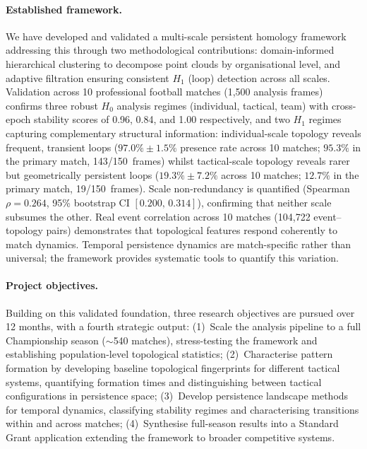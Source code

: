 \paragraph{Established framework.}
We have developed and validated a multi-scale persistent homology framework \citep{Brown2026} addressing this through two methodological contributions: domain-informed hierarchical clustering to decompose point clouds by organisational level, and adaptive filtration ensuring consistent $H_1$ (loop) detection across all scales. Validation across 10 professional football matches (1{,}500 analysis frames) confirms three robust $H_0$ analysis regimes (individual, tactical, team) with cross-epoch stability scores of 0.96, 0.84, and 1.00 respectively, and two $H_1$ regimes capturing complementary structural information: individual-scale topology reveals frequent, transient loops ($97.0\%\pm1.5\%$ presence rate across 10 matches; $95.3\%$ in the primary match, 143/150~frames) whilst tactical-scale topology reveals rarer but geometrically persistent loops ($19.3\%\pm7.2\%$ across 10 matches; $12.7\%$ in the primary match, 19/150~frames). Scale non-redundancy is quantified (Spearman $\rho=0.264$, 95\% bootstrap CI $[0.200,\,0.314]$), confirming that neither scale subsumes the other. Real event correlation across 10 matches (104{,}722 event--topology pairs) demonstrates that topological features respond coherently to match dynamics. Temporal persistence dynamics are match-specific rather than universal; the framework provides systematic tools to quantify this variation.

\paragraph{Project objectives.}
Building on this validated foundation, three research objectives are pursued over 12 months, with a fourth strategic output: (1)~Scale the analysis pipeline to a full Championship season ($\sim$540 matches), stress-testing the framework and establishing population-level topological statistics; (2)~Characterise pattern formation by developing baseline topological fingerprints for different tactical systems, quantifying formation times and distinguishing between tactical configurations in persistence space; (3)~Develop persistence landscape methods for temporal dynamics, classifying stability regimes and characterising transitions within and across matches; (4)~Synthesise full-season results into a Standard Grant application extending the framework to broader competitive systems.

